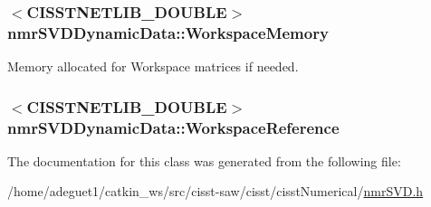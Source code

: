 \hypertarget{classnmr_s_v_d_dynamic_data_abe50251589c5f7d24ae6d2024f7344f0}{
\subsubsection[{Workspace\-Memory}]{$<$C\-I\-S\-S\-T\-N\-E\-T\-L\-I\-B\-\_\-\-D\-O\-U\-B\-L\-E$>$ nmr\-S\-V\-D\-Dynamic\-Data\-::\-Workspace\-Memory\hspace{0.3cm}{\ttfamily [protected]}}}\label{classnmr_s_v_d_dynamic_data_abe50251589c5f7d24ae6d2024f7344f0}
Memory allocated for Workspace matrices if needed. \hypertarget{classnmr_s_v_d_dynamic_data_a616c1ec08f23128458db53bbfb1fa0b2}{
\subsubsection[{Workspace\-Reference}]{$<$C\-I\-S\-S\-T\-N\-E\-T\-L\-I\-B\-\_\-\-D\-O\-U\-B\-L\-E$>$ nmr\-S\-V\-D\-Dynamic\-Data\-::\-Workspace\-Reference\hspace{0.3cm}{\ttfamily [protected]}}}\label{classnmr_s_v_d_dynamic_data_a616c1ec08f23128458db53bbfb1fa0b2}


The documentation for this class was generated from the following file\-:\begin{DoxyCompactItemize}
\item 
/home/adeguet1/catkin\-\_\-ws/src/cisst-\/saw/cisst/cisst\-Numerical/\hyperlink{nmr_s_v_d_8h}{nmr\-S\-V\-D.\-h}\end{DoxyCompactItemize}

